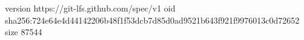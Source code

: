 version https://git-lfs.github.com/spec/v1
oid sha256:724e64e4d44142206b48f1f53dcb7d85d0ad9521b643f921f9976013c0d72652
size 87544
